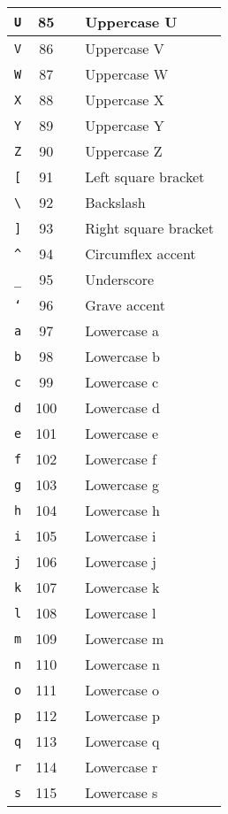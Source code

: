 \documentclass[a4paper]{article}
\theoremstyle{break}
\theoremstyle{break}
\theoremstyle{break}
\theoremstyle{break}
\begin{document}
\begin{xltabular}{\textwidth}{|c|c|c|l|}
	\hline
	\texttt{U} & 85 & & Uppercase U \\
	\hline
	\texttt{V} & 86 & & Uppercase V \\
	\hline
	\texttt{W} & 87 & & Uppercase W \\
	\hline
	\texttt{X} & 88 & & Uppercase X \\
	\hline
	\texttt{Y} & 89 & & Uppercase Y \\
	\hline
	\texttt{Z} & 90 & & Uppercase Z\\
	\hline
	\texttt{[} & 91 & & Left square bracket \\
	\hline
	\texttt{\textbackslash} & 92 & & Backslash \\
	\hline
	\texttt{]} & 93 & & Right square bracket \\
	\hline
	\texttt{\textasciicircum} & 94 & & Circumflex accent\\
	\hline
	\texttt{\_} & 95 & & Underscore \\
	\hline
	\texttt{`} & 96 & & Grave accent \\
	\hline
	\texttt{a} & 97 & & Lowercase a \\
	\hline
	\texttt{b} & 98 & & Lowercase b \\
	\hline
	\texttt{c} & 99 & & Lowercase c \\
	\hline
	\texttt{d} & 100 & & Lowercase d \\
	\hline
	\texttt{e} & 101 & & Lowercase e \\
	\hline
	\texttt{f} & 102 & & Lowercase f \\
	\hline
	\texttt{g} & 103 & & Lowercase g \\
	\hline
	\texttt{h} & 104 & & Lowercase h \\
	\hline
	\texttt{i} & 105 & & Lowercase i \\
	\hline
	\texttt{j} & 106 & & Lowercase j \\
	\hline
	\texttt{k} & 107 & & Lowercase k \\
	\hline
	\texttt{l} & 108 & & Lowercase l \\
	\hline
	\texttt{m} & 109 & & Lowercase m \\
	\hline
	\texttt{n} & 110 & & Lowercase n \\
	\hline
	\texttt{o} & 111 & & Lowercase o \\
	\hline
	\texttt{p} & 112 & & Lowercase p \\
	\hline
	\texttt{q} & 113 & & Lowercase q \\
	\hline
	\texttt{r} & 114 & & Lowercase r \\
	\hline
	\texttt{s} & 115 & & Lowercase s \\

\end{xltabular}
\end{document}
